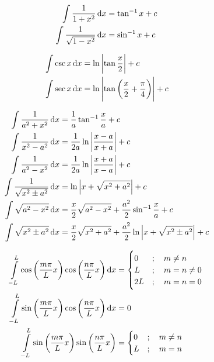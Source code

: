 \documentclass[fleqn, 8pt]{amsart}
\theoremstyle{definition}
\theoremstyle{theorem}
\begin{document}
\begin{multicols}{2}
\begin{spacing}{0.7}
\begin{align*}
	\int \frac{1}{1 + x^2} \dif x &= \tan^{-1} x + c\\
	\int \frac{1}{\sqrt{1 - x^2}} \dif x &= \sin^{-1} x + c
\end{align*}

\begin{align*}
	\int \csc x \dif x &= \ln\left| \tan \frac{x}{2} \right| + c\\
	\int \sec x \dif x &= \ln\left| \tan\left( \frac{x}{2} + \frac{\pi}{4} \right) \right| + c
\end{align*}

\begin{align*}
	\int \frac{1}{a^2 + x^2} \dif x &= \frac{1}{a} \tan^{-1} \frac{x}{a} + c\\
	\int \frac{1}{x^2 - a^2} \dif x &= \frac{1}{2 a} \ln\left| \frac{x - a}{x + a} \right| + c\\
	\int \frac{1}{a^2 - x^2} \dif x &= \frac{1}{2 a} \ln\left| \frac{x + a}{x - a} \right| + c\\
	\int \frac{1}{\sqrt{x^2 \pm a^2}} \dif x &= \ln\left| x + \sqrt{x^2 + a^2} \right| + c\\
	\int \sqrt{a^2 - x^2} \dif x &= \frac{x}{2} \sqrt{a^2 - x^2} + \frac{a^2}{2} \sin^{-1} \frac{x}{a} + c\\
	\int \sqrt{x^2 \pm a^2} \dif x &= \frac{x}{2} \sqrt{x^2 + a^2} + \frac{a^2}{2} \ln\left| x + \sqrt{x^2 \pm a^2} \right| + c
\end{align*}

\begin{align*}
	\int\limits_{-L}^{L} \cos\left( \frac{m \pi}{L} x \right) \cos\left( \frac{n \pi}{L} x \right) \dif x &=
		\begin{cases}
			0 &;\quad m \neq n\\
			L &;\quad m = n \neq 0\\
			2 L &;\quad m = n = 0\\
		\end{cases}\\
	\int\limits_{-L}^{L} \sin\left( \frac{m \pi}{L} x \right) \cos\left( \frac{n \pi}{L} x \right) \dif x &= 0\\
	\int\limits_{-L}^{L} \sin\left( \frac{m \pi}{L} x \right) \sin\left( \frac{n \pi}{L} x \right) &=
		\begin{cases}
			0 &;\quad m \neq n\\
			L &;\quad m = n\\
		\end{cases}
\end{align*}


\end{spacing}
\end{multicols}
\end{document}
